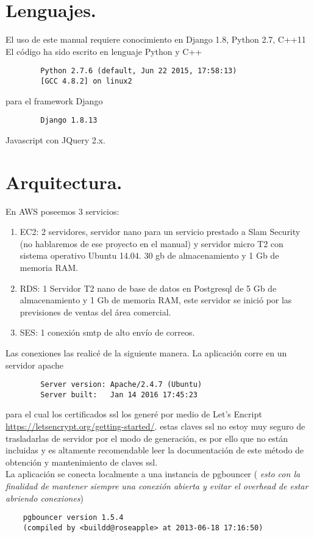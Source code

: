 \documentclass[10pt,a4paper]{book}
\begin{document}
	\section{Lenguajes.}
	El uso de este manual requiere conocimiento en Django 1.8, Python 2.7, C++11
	El código ha sido escrito en lenguaje Python y C++
	\begin{verbatim}
		Python 2.7.6 (default, Jun 22 2015, 17:58:13)
		[GCC 4.8.2] on linux2
	\end{verbatim}
	para el framework Django
	\begin{verbatim}
		Django 1.8.13
	\end{verbatim}
	Javascript con JQuery 2.x.

	\section{Arquitectura.}
	En AWS poseemos 3 servicios:
	\begin{enumerate}
		\item EC2: 2 servidores, servidor nano para un servicio prestado a Slam Security (no hablaremos de ese proyecto en el manual) y servidor micro T2 con sistema operativo Ubuntu 14.04. 30 gb de almacenamiento y 1 Gb de memoria RAM.
		\item RDS: 1 Servidor T2 nano de base de datos en Postgresql de 5 Gb de almacenamiento y 1 Gb de memoria RAM, este servidor se inició por las previsiones de ventas del área comercial.
		\item SES: 1 conexión smtp de alto envío de correos.
	\end{enumerate}

	Las conexiones las realicé de la siguiente manera. La aplicación corre en un servidor apache
	\begin{verbatim}
		Server version: Apache/2.4.7 (Ubuntu)
		Server built:   Jan 14 2016 17:45:23
	\end{verbatim}
	para el cual los certificados ssl los generé por medio de Let's Encript \url{https://letsencrypt.org/getting-started/}. estas claves ssl no estoy muy seguro de trasladarlas de servidor por el modo de generación, es por ello que no están incluidas y es altamente recomendable leer la documentación de este método de obtención  y mantenimiento de claves ssl.\\

	La aplicación se conecta localmente a una instancia de pgbouncer ( \textit{esto con la finalidad de mantener siempre una conexión abierta y evitar el overhead de estar abriendo conexiones})
	\begin{verbatim}
	pgbouncer version 1.5.4
	(compiled by <buildd@roseapple> at 2013-06-18 17:16:50)
	\end{verbatim}
\end{document}
